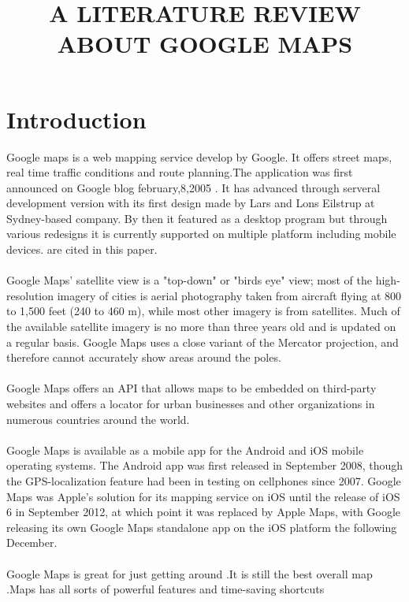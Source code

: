 \documentclass[option]{article}
\title{\textbf{A LITERATURE REVIEW ABOUT GOOGLE MAPS}}
\begin{document}
\section{Introduction}
Google maps is a web mapping service develop by Google. It offers street  maps, real time traffic conditions and route planning.The application was first announced on Google blog february,8,2005 \cite{r1}. It has advanced through serveral development version with its first design made by Lars and Lons Eilstrup at Sydney-based company. By then it featured as a desktop program but through various redesigns it is currently supported on multiple platform including mobile devices.
  are cited in this paper.\\\\
Google Maps' satellite view is a "top-down" or "birds eye" view; most of the high-resolution imagery of cities is aerial photography taken from aircraft flying at 800 to 1,500 feet (240 to 460 m), while most other imagery is from satellites. Much of the available satellite imagery is no more than three years old and is updated on a regular basis. Google Maps uses a close variant of the Mercator projection, and therefore cannot accurately show areas around the poles.\\\\
 Google Maps offers an API that allows maps to be embedded on third-party websites \cite{r2} and offers a locator for urban businesses and other organizations in numerous countries around the world.\\\\
Google Maps is available as a mobile app for the Android and iOS mobile operating systems.
The Android app was first released in September 2008, \cite{r3} though the GPS-localization feature had been in testing on cellphones since 2007. Google Maps was Apple's solution for its mapping service on iOS until the release of iOS 6 in September 2012, at which point it was replaced by Apple Maps, with Google releasing its own Google Maps standalone app on the iOS platform the following December.\\\\
Google Maps is great for just getting around \cite{r4}.It is still the best overall map \cite{r5}.Maps has all sorts of powerful features and time-saving shortcuts


\end{document}
